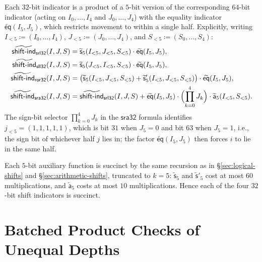\documentclass{article}
\theoremstyle{definition}
\newcommand*{\mle}{\widetilde}
\newcommand{\eq}{\mathsf{eq}}
\begin{document}
Each $32$-bit indicator is a product of a $5$-bit version of the corresponding $64$-bit indicator (acting on $I_0, \ldots, I_4$ and $J_0, \ldots, J_4$) with the equality indicator $\mle{\eq}(I_5, J_5)$, which restricts movement to within a single half. Explicitly, writing $I_{<5} \coloneqq (I_0, \ldots, I_4)$, $J_{<5} \coloneqq (J_0, \ldots, J_4)$, and $S_{<5} \coloneqq (S_0, \ldots, S_4)$:
\begin{align*}
  \mle{\textsf{shift-ind}}_{\textsf{srl32}}(I, J, S) &= \mle{\mathsf{s}}_5(I_{<5}, J_{<5}, S_{<5}) \cdot \mle{\eq}(I_5, J_5), \\
  \mle{\textsf{shift-ind}}_{\textsf{sll32}}(I, J, S) &= \mle{\mathsf{s}}_5(J_{<5}, I_{<5}, S_{<5}) \cdot \mle{\eq}(I_5, J_5), \\
  \mle{\textsf{shift-ind}}_{\textsf{ror32}}(I, J, S) &= \bigl( \mle{\mathsf{s}}_5(I_{<5}, J_{<5}, S_{<5}) + \mle{\mathsf{s}}'_5(I_{<5}, J_{<5}, S_{<5}) \bigr) \cdot \mle{\eq}(I_5, J_5), \\
  \mle{\textsf{shift-ind}}_{\textsf{sra32}}(I, J, S) &= \mle{\textsf{shift-ind}}_{\textsf{srl32}}(I, J, S) + \mle{\eq}(I_5, J_5) \cdot \Bigl( \prod_{k = 0}^4 J_k \Bigr) \cdot \mle{\mathsf{a}}_5(I_{<5}, S_{<5}).
\end{align*}
The sign-bit selector $\prod_{k = 0}^4 J_k$ in the $\textsf{sra32}$ formula identifies $j_{<5} = (1, 1, 1, 1, 1)$, which is bit $31$ when $J_5 = 0$ and bit $63$ when $J_5 = 1$, i.e., the sign bit of whichever half $j$ lies in; the factor $\mle{\eq}(I_5, J_5)$ then forces $i$ to lie in the same half.

Each $5$-bit auxiliary function is succinct by the same recursion as in \S\ref{sec:logical-shifts} and \S\ref{sec:arithmetic-shifts}, truncated to $k = 5$: $\mle{\mathsf{s}}_5$ and $\mle{\mathsf{s}}'_5$ cost at most $60$ multiplications, and $\mle{\mathsf{a}}_5$ costs at most $10$ multiplications. Hence each of the four $32$-bit shift indicators is succinct.

\section{Batched Product Checks of Unequal Depths}
\label{app:padded-prodcheck}
\end{document}
